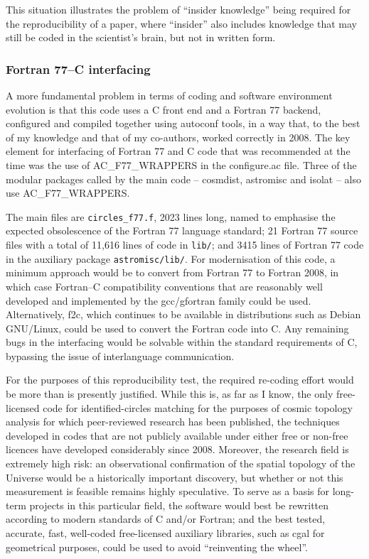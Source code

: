 This situation illustrates the problem of ``insider knowledge'' being
required for the reproducibility of a paper, where ``insider'' also
includes knowledge that may still be coded in the scientist's brain,
but not in written form.

\subsubsection{Fortran 77--C interfacing}

A more fundamental problem in terms of coding and software environment
evolution is that this code uses a C front end and a Fortran 77
backend, configured and compiled together using {\sc autoconf} tools,
in a way that, to the best of my knowledge and that of my co-authors,
worked correctly in 2008. The key element for interfacing of Fortran
77 and C code that was recommended at the time was the use of {\sc
AC\_F77\_WRAPPERS} in the {\sc configure.ac}
file\supercite{ACPROGF77}.  Three of the modular packages called by
the main code -- {\sc cosmdist}, {\sc astromisc} and {\sc isolat} --
also use {\sc AC\_F77\_WRAPPERS}.

The main files are {\tt circles\_f77.f}, 2023 lines long, named to
emphasise the expected obsolescence of the Fortran 77 language
standard; 21 Fortran 77 source files with a total of 11,616 lines of
code in {\tt lib/}; and 3415 lines of Fortran 77 code in the auxiliary
package {\tt astromisc/lib/}. For modernisation of this code, a
minimum approach would be to convert from Fortran 77 to Fortran 2008,
in which case Fortran--C compatibility conventions that are reasonably well
developed and implemented by the {\sc gcc/gfortran} family could be used.
Alternatively, {\sc f2c}, which continues to be available in distributions
such as Debian GNU/Linux, could be used to convert the Fortran code into C.
Any remaining bugs in the interfacing would be solvable within the standard
requirements of C, bypassing the issue of interlanguage communication.

For the purposes of this reproducibility test, the required re-coding
effort would be more than is presently justified. While this is, as
far as I know, the only free-licensed code for identified-circles
matching for the purposes of cosmic topology analysis for which
peer-reviewed research has been published, the techniques developed in
codes that are not publicly available under either free or non-free
licences have developed considerably since 2008.  Moreover, the
research field is extremely high risk: an observational confirmation
of the spatial topology of the Universe would be a historically
important discovery, but whether or not this measurement is feasible
remains highly speculative. To serve as a basis for long-term
projects in this particular field, the software would best be
rewritten according to modern standards of C and/or Fortran; and
the best tested, accurate, fast, well-coded free-licensed
auxiliary libraries, such as {\sc cgal} for geometrical purposes,
could be used to avoid ``reinventing the wheel''.

